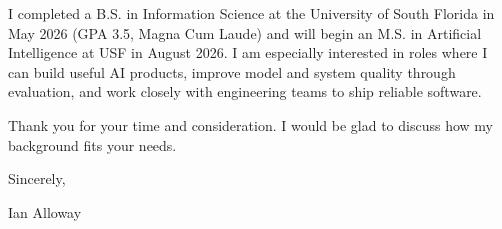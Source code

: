 \documentclass[11pt,letterpaper]{article}
\begin{document}
\vspace{6pt}

I completed a B.S. in Information Science at the University of South Florida in May 2026 (GPA 3.5, Magna Cum Laude) and will begin an M.S. in Artificial Intelligence at USF in August 2026. I am especially interested in roles where I can build useful AI products, improve model and system quality through evaluation, and work closely with engineering teams to ship reliable software.

\vspace{6pt}

Thank you for your time and consideration. I would be glad to discuss how my background fits your needs.

\vspace{12pt}

Sincerely,

\vspace{24pt}

Ian Alloway
\end{document}
